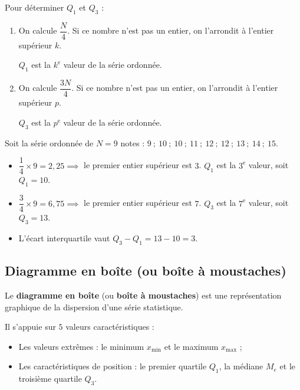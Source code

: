 \begin{methode}
	Pour déterminer $Q_1$ et $Q_3$ :
	\begin{enumerate}[itemsep=2mm]
		\item On calcule $\dfrac{N}{4}$. Si ce nombre n'est pas un entier, on l'arrondit à l'entier supérieur $k$.

		      $Q_1$ est la $k^{\text{e}}$ valeur de la série ordonnée.
		\item On calcule $\dfrac{3N}{4}$. Si ce nombre n'est pas un entier, on l'arrondit à l'entier supérieur $p$.

		      $Q_3$ est la $p^{\text{e}}$ valeur de la série ordonnée.
	\end{enumerate}

	\begin{correction}
		Soit la série ordonnée de $N = 9$ notes : $9 \ ; \ 10 \ ; \ 10 \ ; \ 11 \ ; \ 12 \ ; \ 12 \ ; \ 13 \ ; \ 14 \ ; \ 15$.

		\begin{itemize}[itemsep=2mm]
			\item $\dfrac{1}{4}\times 9 = 2{,}25 \implies$ le premier entier supérieur est $3$. $Q_1$ est la $3^{\text{e}}$ valeur, soit $Q_1 = 10$.
			\item $\dfrac{3}{4}\times 9 = 6{,}75 \implies$ le premier entier supérieur est $7$. $Q_3$ est la $7^{\text{e}}$ valeur, soit $Q_3 = 13$.
			\item L'écart interquartile vaut $Q_3 - Q_1 = 13 - 10 = 3$.
		\end{itemize}
	\end{correction}
\end{methode}

\subsection{Diagramme en boîte (ou boîte à moustaches)}

\begin{defin}
	Le \textbf{diagramme en boîte} (ou \textbf{boîte à moustaches}) est une représentation graphique de la dispersion d'une série statistique.

	Il s'appuie sur $5$ valeurs caractéristiques :
	\begin{itemize}
		\item Les valeurs extrêmes : le minimum $x_{\min}$ et le maximum $x_{\max}$ ;
		\item Les caractéristiques de position : le premier quartile $Q_1$, la médiane $M_e$ et le troisième quartile $Q_3$.
	\end{itemize}
\end{defin}

